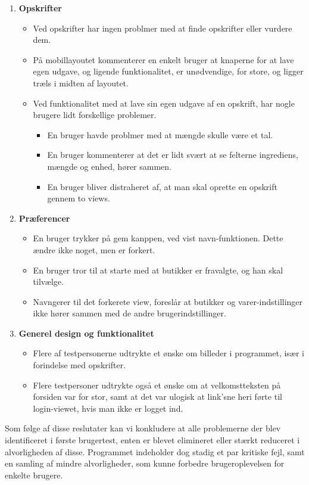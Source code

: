 \begin{enumerate}
\begin{itemize}
   \end{itemize}
   \item \textbf{Opskrifter}
   \begin{itemize}
      \item Ved opskrifter har ingen problmer med at finde opskrifter eller vurdere dem.
      \item På mobillayoutet kommenterer en enkelt bruger at knaperne for at lave egen udgave, og ligende funktionalitet, er unødvendige, for store, og ligger træls i midten af layoutet.
      \item Ved funktionalitet med at lave sin egen udgave af en opskrift, har nogle brugere lidt forskellige problemer.
      \begin{itemize}
         \item En bruger havde problmer med at mængde skulle være et tal.
         \item En bruger kommenterer at det er lidt svært at se felterne ingrediens, mængde og enhed, hører sammen.
         \item En bruger bliver distraheret af, at man skal oprette en opskrift gennem to views.
      \end{itemize} 
   \end{itemize}
   \item \textbf{Præferencer}
   \begin{itemize}
      \item En bruger  trykker på gem kanppen, ved vist navn-funktionen. 
      Dette ændre ikke noget, men er forkert.
      \item En bruger tror til at starte med at butikker er fravalgte, og han skal tilvælge.
      \item Navngerer til det forkerete view, foreslår at butikker og varer-indstillinger ikke hører sammen med de andre brugerindstillinger.
   \end{itemize}
   \item \textbf{Generel design og funktionalitet}
   \begin{itemize}
      \item Flere af testpersonerne udtrykte et ønske om billeder i programmet, især i forindelse med opskrifter.
      \item Flere testpersoner udtrykte også et ønske om at velkomstteksten på forsiden var for stor, samt at det var ulogisk at link'sne heri førte til login-viewet, hvis man ikke er logget ind.
   \end{itemize}
\end{enumerate}

Som følge af disse reslutater kan vi konkludere at alle problemerne der blev identificeret i første brugertest, enten er blevet elimineret eller stærkt reduceret i alvorligheden af disse. 
Programmet indeholder dog stadig et par kritiske fejl, samt en samling af mindre alvorligheder, som kunne forbedre brugeroplevelsen for enkelte brugere.